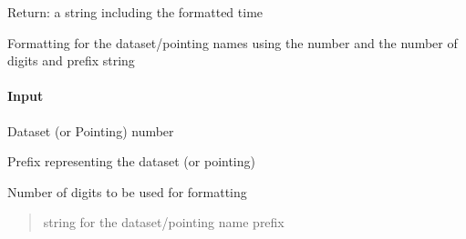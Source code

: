 \documentclass[letterpaper,10pt,english]{sphinxmanual}
\begin{document}

\begin{fulllineitems}
\label{\detokenize{api/pymusepipe:pymusepipe.util_pipe.formatted_time}}
\pysigstartsignatures
{}
\pysigstopsignatures
\sphinxAtStartPar
Return: a string including the formatted time

\end{fulllineitems}


\begin{fulllineitems}
\label{\detokenize{api/pymusepipe:pymusepipe.util_pipe.get_dataset_name}}
\pysigstartsignatures
{}
\pysigstopsignatures
\sphinxAtStartPar
Formatting for the dataset/pointing names using the number and
the number of digits and prefix string


\paragraph{Input}
\label{\detokenize{api/pymusepipe:id164}}\begin{description}
\sphinxAtStartPar
Dataset (or Pointing) number

\sphinxAtStartPar
Prefix representing the dataset (or pointing)

\sphinxAtStartPar
Number of digits to be used for formatting

\end{description}
\begin{quote}\begin{description}
\sphinxAtStartPar
string for the dataset/pointing name prefix

\end{description}\end{quote}

\end{fulllineitems}
\end{document}
